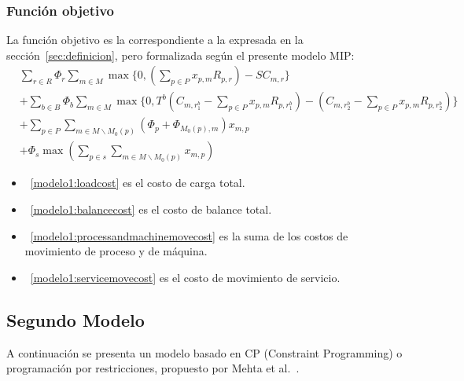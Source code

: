 \documentclass[../informe2.tex]{subfiles}
\begin{document}
\subsubsection{Función objetivo}
La función objetivo es la correspondiente a la expresada en la sección~\ref{sec:definicion}, pero formalizada según el presente modelo MIP:\@
\begin{align}
	\label{modelo1:loadcost}& \sum_{r \in R}\Phi_{r}\sum_{m \in M}\max \{ 0,(\sum_{p \in P}x_{p,m}R_{p,r}) - SC_{m,r} \} \\
	\label{modelo1:balancecost}&+ \sum_{b \in B}\Phi_{b}\sum_{m \in M}\max\{0, T^b(C_{m,r_{1}^b} - \sum_{p \in P}x_{p,m}R_{p,r_{1}^b}) - (C_{m,r_{2}^b} - \sum_{p \in P}x_{p,m}R_{p,r_{2}^b})\} \\
	\label{modelo1:processandmachinemovecost}&+ \sum_{p \in P}\sum_{m \in M \backslash M_0(p)}(\Phi_{p} + \Phi_{M_0(p),m})x_{m,p} \\
	\label{modelo1:servicemovecost}&+ \Phi_{s}\max(\sum_{p \in s}\sum_{m \in M \backslash M_0(p)}x_{m,p})
\end{align}
\bigskip
\begin{itemize}
	\item~\eqref{modelo1:loadcost} es el costo de carga total.
	\item~\eqref{modelo1:balancecost} es el costo de balance total.
	\item~\eqref{modelo1:processandmachinemovecost} es la suma de los costos de movimiento de proceso y de máquina.
	\item~\eqref{modelo1:servicemovecost} es el costo de movimiento de servicio.
\end{itemize}


\subsection{Segundo Modelo}
A continuación se presenta un modelo basado en CP (Constraint Programming) o programación por restricciones, propuesto por Mehta et al.~\cite{mehta2012comparing}.
\end{document}
